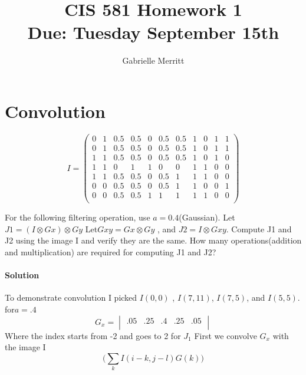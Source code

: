 \documentclass[11pt,english]{article}
\title{CIS 581 Homework 1 \\
Due:  Tuesday September 15th}
\author{Gabrielle Merritt}
\date{}
\begin{document}
\maketitle
\section*{ Convolution } 

\begin{equation}
 I = \begin{pmatrix}
0 & 1 & 0.5 & 0.5 & 0 & 0.5 & 0.5 & 1 & 0 & 1 & 1 \\
0 & 1 & 0.5 & 0.5 & 0 & 0.5 & 0.5 & 1 & 0 & 1 & 1 \\
1 & 1 & 0.5 & 0.5 & 0 & 0.5 & 0.5 & 1 & 0 & 1 & 0 \\
1 & 1 & 0   & 1   & 1 & 0   & 0   & 1 & 1 & 0 & 0 \\
1 & 1 & 0.5 & 0.5 & 0 & 0.5 & 1   & 1 & 1 & 0 & 0 \\
0 & 0 & 0.5 & 0.5 & 0 & 0.5 & 1   & 1 & 0 & 0 & 1 \\
0 & 0 & 0.5 & 0.5 & 1 & 1   & 1   & 1 & 1 & 0 & 0\\
\end{pmatrix}
\end{equation}

For the following filtering operation, use $a = 0.4$(Gaussian). 
Let $ J1 = (I \otimes Gx) \otimes Gy $
Let$ Gxy = Gx \otimes Gy$ , and $ J2 = I \otimes  Gxy$.
Compute J1 and J2 using the image
I and verify they are the same. How many operations(addition
and multiplication) are required for computing J1 and  J2?

\paragraph{Solution}
To demonstrate convolution I picked $I(0,0)$ , $I(7,11)$, $I(7,5)$, and $I(5,5)$.
for$ a = .4$
$$G_x = \begin{vmatrix}
.05 & .25& .4 &.25 &.05\\
\end{vmatrix} $$
 Where the index starts from -2 and goes to 2
for $J_1$ First we convolve $G_x$ with the image I
$$\big(\sum_k I(i -k, j-l) G(k)\big)  $$ 
\end{document}
